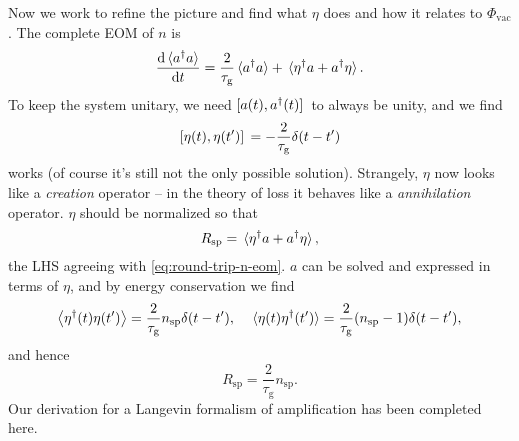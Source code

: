 \documentclass[hyperref, a4paper]{article}
\newcommand*{\taug}{\tau_{\text{g}}}
\begin{document}
Now we work to refine the picture and find what $\eta$ does and how it relates to $\Phi_{\text{vac}}$.
The complete EOM of $n$ is 
\begin{equation}
    \dv{\expval*{a^\dag a}}{t} = \frac{2}{\taug} \expval*{a^\dag a} + \expval*{\eta^\dag a + a^\dag \eta}.
\end{equation}
To keep the system unitary, we need $\comm*{a(t)}{a^\dag(t)}$ to always be unity, and we find 
\begin{equation}
    \comm*{\eta(t)}{\eta(t')} = - \frac{2}{\taug} \delta(t - t')
\end{equation}
works (of course it's still not the only possible solution).
Strangely, $\eta$ now looks like a \emph{creation} operator -- 
in the theory of loss it behaves like a \emph{annihilation} operator.
$\eta$ should be normalized so that 
\begin{equation}
    R_{\text{sp}} = \expval*{\eta^\dag a + a^\dag \eta},
\end{equation}
the LHS agreeing with \eqref{eq:round-trip-n-eom}.
$a$ can be solved and expressed in terms of $\eta$,
and by energy conservation we find 
\begin{equation}
    \expval{\eta^\dag(t) \eta(t')} = \frac{2}{\taug} n_{\text{sp}} \delta(t - t'), \quad 
    \expval*{\eta(t) \eta^\dag(t')} = \frac{2}{\taug} (n_{\text{sp}} - 1) \delta(t - t'),
\end{equation}
and hence 
\begin{equation}
    R_{\text{sp}} = \frac{2}{\taug} n_{\text{sp}}.
\end{equation}
Our derivation for a Langevin formalism of amplification has been completed here.
\end{document}
